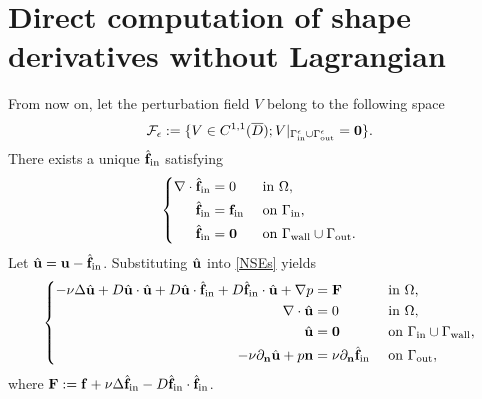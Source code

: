 \documentclass[oneside,11pt]{book}
\numberwithin{equation}{section}
\begin{document}
\section{Direct computation of shape derivatives without Lagrangian}
From now on, let the perturbation field $V$ belong to the following space
\begin{align}
    \mathcal{F}_\epsilon := \{V\in C^{1,1}(\overline{D});V|_{\Gamma_{\rm in}^\epsilon\cup\Gamma_{\rm out}^\epsilon} = {\bf 0}\}.
\end{align}
There exists a unique $\hat{\bf f}_{\rm in}$ satisfying
\begin{equation*}
    \left\{\begin{split}
        \nabla\cdot\hat{\bf f}_{\rm in} &= 0 &&\mbox{ in } \Omega,\\
        \hat{\bf f}_{\rm in} &= {\bf f}_{\rm in} &&\mbox{ on } \Gamma_{\rm in},\\
        \hat{\bf f}_{\rm in} &= {\bf 0} &&\mbox{ on } \Gamma_{\rm wall}\cup\Gamma_{\rm out}.
    \end{split}\right.
\end{equation*}
Let $\hat{\bf u} = {\bf u} - \hat{\bf f}_{\rm in}$. Substituting $\hat{\bf u}$ into \eqref{NSEs} yields
\begin{equation}
    \left\{\begin{split}
        -\nu\Delta\hat{\bf u} + D\hat{\bf u}\cdot\hat{\bf u} + D\hat{\bf u}\cdot\hat{\bf f}_{\rm in} + D\hat{\bf f}_{\rm in}\cdot\hat{\bf u} + \nabla p &= {\bf F} &&\mbox{ in } \Omega,\\
        \nabla\cdot\hat{\bf u} &= 0 &&\mbox{ in } \Omega,\\
        \hat{\bf u} &= {\bf 0} &&\mbox{ on } \Gamma_{\rm in}\cup\Gamma_{\rm wall},\\
        -\nu\partial_{\bf n}\hat{\bf u} + p{\bf n} &= \nu\partial_{\bf n}\hat{\bf f}_{\rm in} &&\mbox{ on } \Gamma_{\rm out},
    \end{split}\right.
\end{equation}
where ${\bf F} := {\bf f} + \nu\Delta\hat{\bf f}_{\rm in} - D\hat{\bf f}_{\rm in}\cdot\hat{\bf f}_{\rm in}$.
\end{document}
